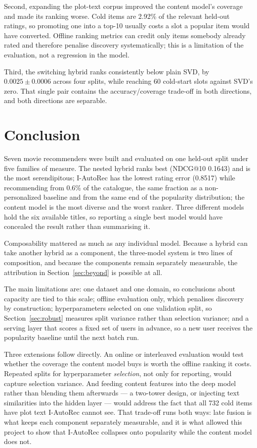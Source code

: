 \documentclass[10pt,twocolumn,letterpaper]{article}
\begin{document}
Second, expanding the plot-text corpus improved the content model's coverage
and made its ranking worse. Cold items are 2.92\% of the relevant held-out
ratings, so promoting one into a top-10 usually costs a slot a popular item
would have converted. Offline ranking metrics can credit only items somebody
already rated and therefore penalise discovery systematically; this is a
limitation of the evaluation, not a regression in the model.

Third, the switching hybrid ranks consistently below plain SVD, by
$0.0025 \pm 0.0006$ across four splits, while reaching 60 cold-start slots
against SVD's zero. That single pair contains the accuracy/coverage trade-off
in both directions, and both directions are separable.

\section{Conclusion}

Seven movie recommenders were built and evaluated on one held-out split under
five families of measure. The nested hybrid ranks best (NDCG@10 0.1643) and is
the most serendipitous; I-AutoRec has the lowest rating error (0.8517) while
recommending from 0.6\% of the catalogue, the same fraction as a
non-personalized baseline and from the same end of the popularity
distribution; the content model is the most diverse and the worst ranker.
Three different models hold the six available titles, so reporting a single
best model would have concealed the result rather than summarising it.

Composability mattered as much as any individual model. Because a hybrid can
take another hybrid as a component, the three-model system is two lines of
composition, and because the components remain separately measurable, the
attribution in Section~\ref{sec:beyond} is possible at all.

The main limitations are: one dataset and one domain, so conclusions about
capacity are tied to this scale; offline evaluation only, which penalises
discovery by construction; hyperparameters selected on one validation split,
so Section~\ref{sec:robust} measures split variance rather than selection
variance; and a serving layer that scores a fixed set of users in advance, so
a new user receives the popularity baseline until the next batch run.

Three extensions follow directly. An online or interleaved evaluation would
test whether the coverage the content model buys is worth the offline ranking
it costs. Repeated splits for hyperparameter \emph{selection}, not only for
reporting, would capture selection variance. And feeding content features into
the deep model rather than blending them afterwards --- a two-tower design, or
injecting text similarities into the hidden layer --- would address the fact
that all 732 cold items have plot text I-AutoRec cannot see. That trade-off
runs both ways: late fusion is what keeps each component separately
measurable, and it is what allowed this project to show that I-AutoRec
collapses onto popularity while the content model does not.
\end{document}
